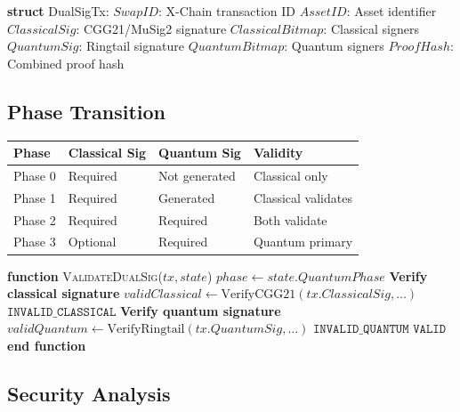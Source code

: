 \documentclass[11pt]{article}
\begin{document}
\begin{algorithmic}[1]
\State \textbf{struct} DualSigTx:
\State \quad $SwapID$: X-Chain transaction ID
\State \quad $AssetID$: Asset identifier
\State \quad $ClassicalSig$: CGG21/MuSig2 signature
\State \quad $ClassicalBitmap$: Classical signers
\State \quad $QuantumSig$: Ringtail signature
\State \quad $QuantumBitmap$: Quantum signers
\State \quad $ProofHash$: Combined proof hash
\end{algorithmic}


\subsection{Phase Transition}

\begin{table}[h]
\centering
\begin{tabular}{@{}llll@{}}
\toprule
\textbf{Phase} & \textbf{Classical Sig} & \textbf{Quantum Sig} & \textbf{Validity} \\
\midrule
Phase 0 & Required & Not generated & Classical only \\
Phase 1 & Required & Generated & Classical validates \\
Phase 2 & Required & Required & Both validate \\
Phase 3 & Optional & Required & Quantum primary \\
\bottomrule
\end{tabular}

\label{tab:quantum-phases}
\end{table}



\begin{algorithmic}[1]
\State \textbf{function} \textsc{ValidateDualSig}($tx, state$)
    \State $phase \gets state.QuantumPhase$
    \State
        \State \textbf{Verify classical signature}
        \State $validClassical \gets \text{VerifyCGG21}(tx.ClassicalSig, \ldots)$
            \State \Return $\texttt{INVALID\_CLASSICAL}$
        \EndIf
    \EndIf
    \State
        \State \textbf{Verify quantum signature}
        \State $validQuantum \gets \text{VerifyRingtail}(tx.QuantumSig, \ldots)$
            \State \Return $\texttt{INVALID\_QUANTUM}$
        \EndIf
    \EndIf
    \State
    \State \Return $\texttt{VALID}$
\State \textbf{end function}
\end{algorithmic}


\subsection{Security Analysis}
\end{document}
